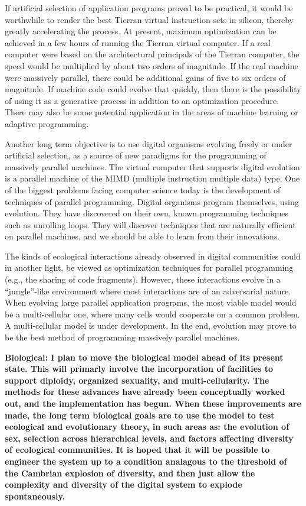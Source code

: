 If artificial selection of application programs proved to be practical, it
would be worthwhile to render the best Tierran virtual instruction sets in
silicon, thereby greatly accelerating the process.  At present, maximum
optimization can be achieved in a few hours of running the Tierran virtual
computer.  If a real computer were based on the architectural principals of
the Tierran computer, the speed would be multiplied by about two orders of
magnitude.  If the real machine were massively parallel, there could be
additional gains of five to six orders of magnitude.  If machine code could
evolve that quickly, then there is the possibility of using it as a generative
process in addition to an optimization procedure.  There may also be some
potential application in the areas of machine learning or adaptive programming.

Another long term objective is to use digital organisms evolving freely or
under artificial selection, as a source of new paradigms for the programming
of massively parallel machines.  The virtual computer that supports digital
evolution is a parallel machine of the MIMD (multiple instruction multiple
data) type.  One of the biggest problems facing computer science today is
the development of techniques of parallel programming.  Digital organisms
program themselves, using evolution.  They have discovered on their own, known
programming techniques such as unrolling loops.  They will discover techniques
that are naturally efficient on parallel machines, and we should be able
to learn from their innovations.

The kinds of ecological interactions already
observed in digital communities could in another light, be viewed as
optimization techniques for parallel programming (e.g., the sharing of
code fragments).  However, these interactions evolve in a ``jungle''-like
environment where most interactions are of an adversarial nature.  When
evolving large parallel application programs, the most viable model would
be a multi-cellular one, where many cells would cooperate on a common
problem.  A multi-cellular model is under development.  In the end, evolution
may prove to be the best method of programming massively parallel machines.

\bf Biological: \rm  I plan to move the biological model ahead of its
present state.  This will primarly involve the incorporation of facilities
to support diploidy, organized sexuality, and multi-cellularity.  The
methods for these advances have already been conceptually worked out, and
the implementation has begun.  When these improvements are made, the long
term biological goals are to use the model to test ecological and
evolutionary theory, in such areas as: the evolution of sex, selection across
hierarchical levels, and factors affecting diversity of ecological communities.
It is hoped that it will be possible to engineer the system up to a condition
analagous to the threshold of the Cambrian explosion of diversity, and then
just allow the complexity and diversity of the digital system to explode
spontaneously.


